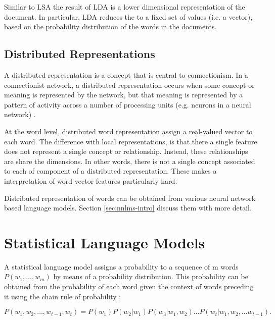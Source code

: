 Similar to \ac{LSA} the result of \ac{LDA} is a lower dimensional
representation of the document. In particular, LDA
reduces the  to a fixed set of values  (i.e. a vector),  based on the
probability distribution of the words in the documents.

 \subsection{Distributed Representations}
 \label{sec:dis_rep}
A distributed representation is a concept that is central to connectionism.
In a connectionist network, a distributed representation occurs when some
concept or meaning is represented by the network, but that meaning is
represented by a pattern of activity across a number of processing units
(e.g. neurons in a neural network) \cite{hinton:learndistrep}. 

At the word level, distributed word representation assign a real-valued vector
to each word. The difference with local representations, is that there a single
feature does not represent a single concept or relationship. Instead, these
relationships are share the dimensions. In other words, there is not a
single concept associated to each of component of a distributed
representation. These makes a interpretation of word vector features
particularly hard.

Distributed representation of words can be obtained from various neural
network based language models. Section \ref{sec:nnlms-intro} discuss them
with more detail.





\section{Statistical Language Models}
\label{sec:relwork-language-models}

A statistical language model assigns a probability to a sequence of m
words $P(w_1,\ldots,w_m)$ by means of a probability distribution. 
This probability can be obtained from the probability of
each word given the context of words preceding it using the chain rule of probability \cite{Bengio:2008}:

\begin{equation}
\label{eq:lm_probability}
 P(w_1, w_2, \ldots, w_{t-1},w_t) = P(w_1) P(w_2|w_1) P(w_3|w_1,w_2) \ldots 
  P(w_t | w_1, w_2, \ldots w_{t-1}).
\end{equation}

